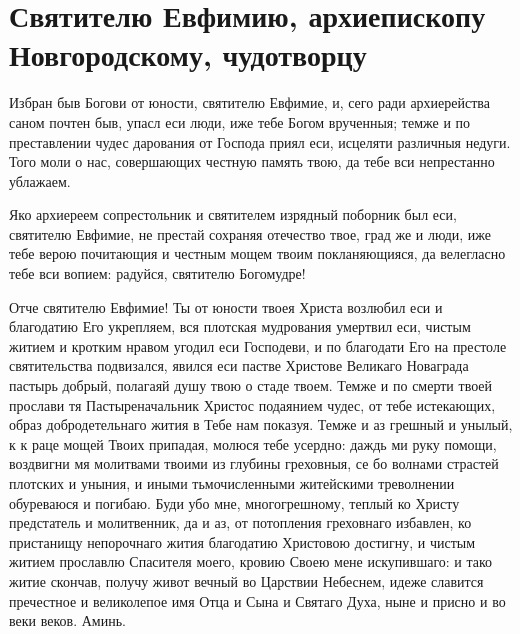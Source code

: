 \section{Святителю Евфимию, архиепископу Новгородскому, чудотворцу}\begin{mymulticols}


Избран быв Богови от юности, святителю Евфимие, и, сего ради архиерейства саном почтен быв, упасл еси люди, иже тебе Богом врученныя; темже и по преставлении чудес дарования от Господа приял еси, исцеляти различныя недуги. Того моли о нас, совершающих честную память твою, да тебе вси непрестанно ублажаем.


Яко архиереем сопрестольник и святителем изрядный поборник был еси, святителю Евфимие, не престай сохраняя отечество твое, град же и люди, иже тебе верою почитающия и честным мощем твоим покланяющияся, да велегласно тебе вси вопием: радуйся, святителю Богомудре!


Отче святителю Евфимие! Ты от юности твоея Христа возлюбил еси и благодатию Его укрепляем, вся плотская мудрования умертвил еси, чистым житием и кротким нравом угодил еси Господеви, и по благодати Его на престоле святительства подвизался, явился еси пастве Христове Великаго Новаграда пастырь добрый, полагаяй душу твою о стаде твоем. Темже и по смерти твоей прослави тя Пастыреначальник Христос подаянием чудес, от тебе истекающих, образ добродетельнаго жития в Тебе нам показуя. Темже и аз грешный и унылый, к к раце мощей Твоих припадая, молюся тебе усердно: даждь ми руку помощи, воздвигни мя молитвами твоими из глубины греховныя, се бо волнами страстей плотских и уныния, и иными тьмочисленными житейскими треволнении обуреваюся и погибаю. Буди убо мне, многогрешному, теплый ко Христу предстатель и молитвенник, да и аз, от потопления греховнаго избавлен, ко пристанищу непорочнаго жития благодатию Христовою достигну, и чистым житием прославлю Спасителя моего, кровию Своею мене искупившаго: и тако житие скончав, получу живот вечный во Царствии Небеснем, идеже славится пречестное и великолепое имя Отца и Сына и Святаго Духа, ныне и присно и во веки веков. Аминь. 

\end{mymulticols}

